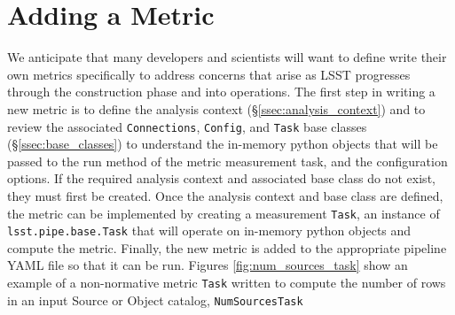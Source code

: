 \section{Adding a  Metric} \label{sec:add}

We anticipate that many developers and scientists will want to define write their own metrics specifically to address concerns that arise as LSST progresses through the construction phase and into operations.
The first step in writing a new metric is to define the analysis context (\S \ref{ssec:analysis_context}) and to review the associated \texttt{Connections},  \texttt{Config}, and  \texttt{Task} base classes (\S \ref{ssec:base_classes}) to understand the in-memory python objects that will be passed to the run method of the metric measurement task, and the configuration options.
If the required analysis context and associated base class do not exist, they must first be created. 
Once the analysis context and base class are defined, the metric can be implemented by creating a measurement \texttt{Task}, an instance of \texttt{lsst.pipe.base.Task} that will operate on in-memory python objects and compute the metric. 
Finally, the new metric is added to the appropriate pipeline YAML file so that it can be run.
Figures \ref{fig:num_sources_task} show an example of a non-normative metric \texttt{Task} written to compute the number of rows in an input Source or Object catalog, \texttt{NumSourcesTask}

